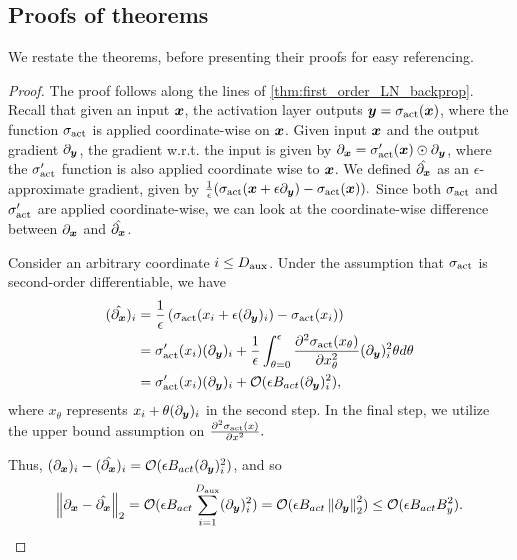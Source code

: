 \subsection{Proofs of theorems}
We restate the theorems, before presenting their proofs for easy referencing.


\firstorderactbckprop*
\begin{proof}
    The proof follows along the lines of \cref{thm:first_order_LN_backprop}. Recall that given an input ${\bm{x}}$, the activation layer outputs ${\bm{y}} = \sigma_{\textrm{act}}({\bm{x}})$, where the function $\sigma_{\textrm{act}}$ is applied coordinate-wise on ${\bm{x}}$. Given input ${\bm{x}}$ and the output gradient $\partial_{{\bm{y}}}$, the gradient w.r.t. the input is given by $\partial_{{\bm{x}}} = \sigma_{\textrm{act}}'({\bm{x}}) \odot \partial_{{\bm{y}}}$, where the $\sigma_{\textrm{act}}'$ function is also applied coordinate wise to ${\bm{x}}$. We defined $\Hat{\partial_{{\bm{x}}}}$ as an $\epsilon$-approximate gradient, given by $\frac{1}{\epsilon} ( \sigma_{\textrm{act}}({\bm{x}} + \epsilon \partial_{{\bm{y}}}) - \sigma_{\textrm{act}}({\bm{x}} ) ).$ Since both $\sigma_{\textrm{act}}$ and $\sigma_{\textrm{act}}'$ are applied coordinate-wise, we can look at the coordinate-wise difference between $\partial_{{\bm{x}}}$ and $\Hat{\partial_{{\bm{x}}}}$.

    Consider an arbitrary coordinate $i \le D_{\text{aux}}$. Under the assumption that $\sigma_{\textrm{act}}$ is second-order differentiable, we have
    \begin{align*}
       (\Hat{\partial_{{\bm{x}}}})_i &= \frac{1}{\epsilon} \left( \sigma_{\textrm{act}}( x_i + \epsilon (\partial_{{\bm{y}}})_i ) - \sigma_{\textrm{act}}( x_i) \right) \\&
        = \sigma_{\textrm{act}}'(x_i)  (\partial_{{\bm{y}}})_i + \frac{1}{\epsilon} \int_{\theta=0}^{\epsilon} \frac{\partial^2 \sigma_{\textrm{act}}( x_{\theta} ) }{ \partial x^2_{\theta} } (\partial_{{\bm{y}}})^2_i  \theta d\theta \\&
        = \sigma_{\textrm{act}}'(x_i)  (\partial_{{\bm{y}}})_i + \mathcal{O}( \epsilon B_{act} (\partial_{{\bm{y}}})_i^2 ),
    \end{align*}
    where $x_{\theta}$ represents $ x_i + \theta (\partial_{{\bm{y}}})_i$ in the second step. In the final step, we utilize the upper bound assumption on $\frac{\partial^2 \sigma_{\textrm{act}}(x)}{ \partial x^2 }.$

    Thus, $(\partial_{{\bm{x}}})_i - (\Hat{\partial_{{\bm{x}}}})_i = \mathcal{O}( \epsilon B_{act} (\partial_{{\bm{y}}})_i^2 )$, and so
    \begin{align*}
        \left\| \partial_{{\bm{x}}} - \Hat{\partial_{{\bm{x}}}} \right\|_2 = \mathcal{O} ( \epsilon B_{act} \sum_{i=1}^{D_{\text{aux}}}(\partial_{{\bm{y}}})_i^2 ) = \mathcal{O} ( \epsilon B_{act} \left\| \partial_{{\bm{y}}} \right\|_2^2 ) \le \mathcal{O} ( \epsilon B_{act}  B_y^2 ).
    \end{align*}
\end{proof}



